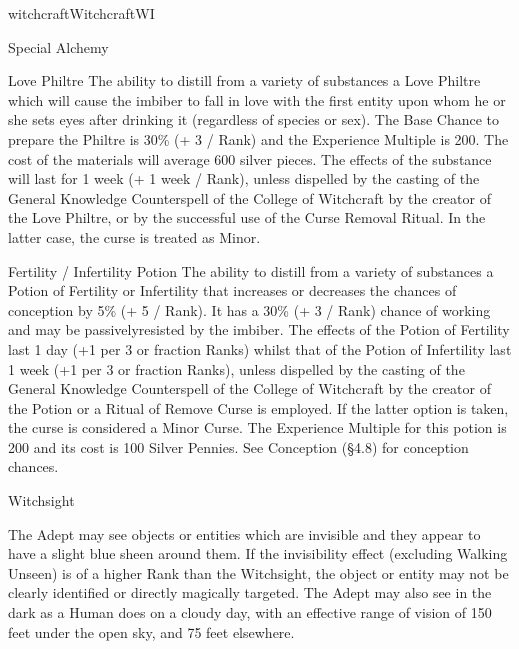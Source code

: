 \begin{College}[1.1]{witchcraft}{Witchcraft}{WI}
\begin{talent}[T-2]{Special Alchemy}
\begin{effects}
\begin{Description}
\item[Love Philtre] The ability to distill from a variety of
  substances a Love Philtre which will cause the imbiber to fall in
  love with the first entity upon whom he or she sets eyes after
  drinking it (regardless of species or sex). The Base Chance to
  prepare the Philtre is 30\% (+ 3 / Rank) and the Experience Multiple
  is 200.  The cost of the materials will average 600 silver pieces.
  The effects of the substance will last for 1 week (+ 1 week /
  Rank), unless dispelled by the casting of the General Knowledge
  Counterspell of the College of Witchcraft by the creator of the Love
  Philtre, or by the successful use of the Curse Removal Ritual. In
  the latter case, the curse is treated as Minor.

\item[Fertility / Infertility] Potion The ability to distill from a
  variety of substances a Potion of Fertility or Infertility that
  increases or decreases the chances of conception by 5\% (+ 5 /
  Rank). It has a 30\% (+ 3 / Rank) chance of working and may be
  passivelyresisted by the imbiber. The effects of the Potion of
  Fertility last 1 day (+1 per 3 or fraction Ranks) whilst that of the
  Potion of Infertility last 1 week (+1 per 3 or fraction Ranks),
  unless dispelled by the casting of the General Knowledge
  Counterspell of the College of Witchcraft by the creator of the
  Potion or a Ritual of Remove Curse is employed. If the latter option
  is taken, the curse is considered a Minor Curse.  The Experience
  Multiple for this potion is 200 and its cost is 100 Silver
  Pennies. See Conception (§4.8) for conception chances.
\end{Description}
\end{effects}
\end{talent}

\begin{talent}[T-3]{Witchsight}

\begin{effects}
The Adept may see objects or entities which are invisible and they
appear to have a slight blue sheen around them.  If the invisibility
effect (excluding Walking Unseen) is of a higher Rank than the
Witchsight, the object or entity may not be clearly identified or
directly magically targeted.  The Adept may also see in the dark as a
Human does on a cloudy day, with an effective range of vision of 150
feet under the open sky, and 75 feet elsewhere.
\end{effects}
\end{talent}


\end{College}
